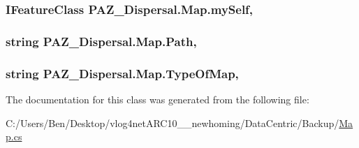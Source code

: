 \hypertarget{class_p_a_z___dispersal_1_1_map_a7f55a7fcffe5bb08d60e9236ecf7e937}{
\subsubsection[{my\-Self}]{\setlength{\rightskip}{0pt plus 5cm}I\-Feature\-Class P\-A\-Z\-\_\-\-Dispersal.\-Map.\-my\-Self\hspace{0.3cm}{\ttfamily [get]}, {\ttfamily [set]}}}\label{class_p_a_z___dispersal_1_1_map_a7f55a7fcffe5bb08d60e9236ecf7e937}
\hypertarget{class_p_a_z___dispersal_1_1_map_a3e63c5ed88f336ffe583bf308234f22a}{
\subsubsection[{Path}]{\setlength{\rightskip}{0pt plus 5cm}string P\-A\-Z\-\_\-\-Dispersal.\-Map.\-Path\hspace{0.3cm}{\ttfamily [get]}, {\ttfamily [set]}}}\label{class_p_a_z___dispersal_1_1_map_a3e63c5ed88f336ffe583bf308234f22a}
\hypertarget{class_p_a_z___dispersal_1_1_map_a66ec0a1f1492bc2ce0979b90f316e3e7}{
\subsubsection[{Type\-Of\-Map}]{\setlength{\rightskip}{0pt plus 5cm}string P\-A\-Z\-\_\-\-Dispersal.\-Map.\-Type\-Of\-Map\hspace{0.3cm}{\ttfamily [get]}, {\ttfamily [set]}}}\label{class_p_a_z___dispersal_1_1_map_a66ec0a1f1492bc2ce0979b90f316e3e7}


The documentation for this class was generated from the following file\-:\begin{DoxyCompactItemize}
\item 
C\-:/\-Users/\-Ben/\-Desktop/vlog4net\-A\-R\-C10\-\_\-\_\-newhoming/\-Data\-Centric/\-Backup/\hyperlink{_backup_2_map_8cs}{Map.\-cs}\end{DoxyCompactItemize}

